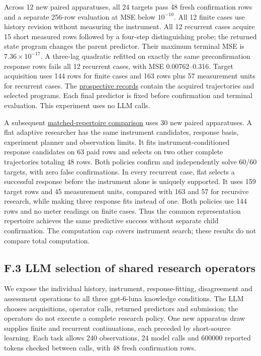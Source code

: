 \documentclass[11pt,a4paper]{article}
\begin{document}
Across 12 new paired apparatuses, all 24 targets pass 48 fresh confirmation rows
and a separate 256-row evaluation at MSE below \(10^{-10}\). All 12 finite cases
use history revision without measuring the instrument. All 12 recurrent cases
acquire 15 short measured rows followed by a four-step distinguishing probe;
the returned state program changes the parent predictor. Their maximum terminal
MSE is \(7.36\times10^{-17}\). A three-lag quadratic refitted on exactly the same
preconfirmation response rows fails all 12 recurrent cases, with MSE
0.00762--0.316. Target acquisition uses 144 rows for finite cases and 163 rows
plus 57 measurement units for recurrent cases. The
\hyperlink{artifact-54}{prospective records}
contain the acquired trajectories and selected programs. Each final predictor
is fixed before confirmation and terminal evaluation. This experiment uses no
LLM calls.


A subsequent \hyperlink{artifact-55}{matched-repertoire comparison}
uses 30 new paired apparatuses. A flat adaptive researcher has the same
instrument candidates, response basis, experiment planner and observation limits.
It fits instrument-conditioned response candidates on 63 paid rows and selects
on two other complete trajectories totaling 48 rows. Both policies confirm and
independently solve 60/60 targets, with zero false confirmations. In every
recurrent case, flat selects a successful response before the instrument alone
is uniquely supported. It uses 159 target rows and 45 measurement units, compared
with 163 and 57 for recursive research, while making three response fits instead
of one. Both policies use 144 rows and no meter readings on finite cases. Thus
the common representation repertoire achieves the same predictive success
without separate child confirmation. The computation cap covers instrument
search; these results do not compare total computation.


\subsection*{F.3 LLM selection of shared research operators}

We expose the individual history, instrument, response-fitting, disagreement
and assessment operations to all three gpt-6-luna knowledge conditions. The
LLM chooses acquisitions, operator calls, returned predictors and submission;
the operators do not execute a complete research policy. One new apparatus draw
supplies finite and recurrent continuations, each preceded by short-source
learning. Each task allows 240 observations, 24 model calls and 600000 reported
tokens checked between calls, with 48 fresh confirmation rows.
\end{document}
